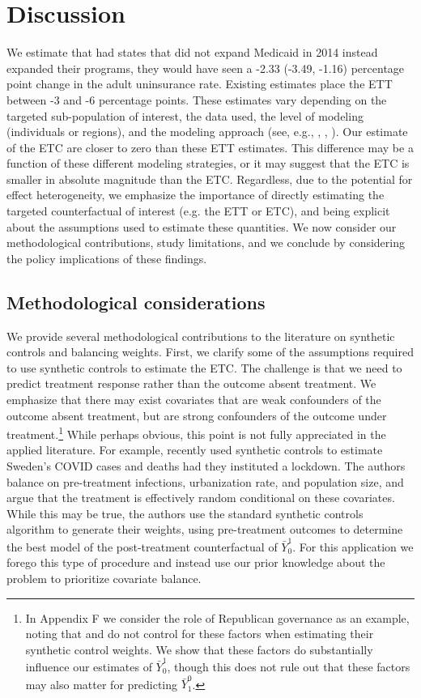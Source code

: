 \documentclass[aoas]{imsart}
\theoremstyle{plain}
\theoremstyle{remark}
\begin{document}
\section{Discussion}

We estimate that had states that did not expand Medicaid in 2014 instead expanded their programs, they would have seen a -2.33 (-3.49, -1.16) percentage point change in the adult uninsurance rate. Existing estimates place the ETT between -3 and -6 percentage points. These estimates vary depending on the targeted sub-population of interest, the data used, the level of modeling (individuals or regions), and the modeling approach (see, e.g., \cite{courtemanche2017early}, \cite{kaestner2017effects}, \cite{frean2017premium}). Our estimate of the ETC are closer to zero than these ETT estimates. This difference may be a function of these different modeling strategies, or it may suggest that the ETC is smaller in absolute magnitude than the ETC. Regardless, due to the potential for effect heterogeneity, we emphasize the importance of directly estimating the targeted counterfactual of interest (e.g. the ETT or ETC), and being explicit about the assumptions used to estimate these quantities. We now consider our methodological contributions, study limitations, and we conclude by considering the policy implications of these findings.

\subsection{Methodological considerations}

We provide several methodological contributions to the literature on synthetic controls and balancing weights. First, we clarify some of the assumptions required to use synthetic controls to estimate the ETC. The challenge is that we need to predict treatment response rather than the outcome absent treatment. We emphasize that there may exist covariates that are weak confounders of the outcome absent treatment, but are strong confounders of the outcome under treatment.\footnote{In Appendix F we consider the role of Republican governance as an example, noting that \cite{kaestner2017effects} and \cite{courtemanche2017early} do not control for these factors when estimating their synthetic control weights. We show that these factors do substantially influence our estimates of $\bar{Y}_0^1$, though this does not rule out that these factors may also matter for predicting $\bar{Y}_1^0$.} While perhaps obvious, this point is not fully appreciated in the applied literature. For example, \cite{born2020lockdowns} recently used synthetic controls to estimate Sweden's COVID cases and deaths had they instituted a lockdown. The authors balance on pre-treatment infections, urbanization rate, and population size, and argue that the treatment is effectively random conditional on these covariates. While this may be true, the authors use the standard synthetic controls algorithm to generate their weights, using pre-treatment outcomes to determine the best model of the post-treatment counterfactual of $\bar{Y}^1_0$. For this application we forego this type of procedure and instead use our prior knowledge about the problem to prioritize covariate balance.
\end{document}

